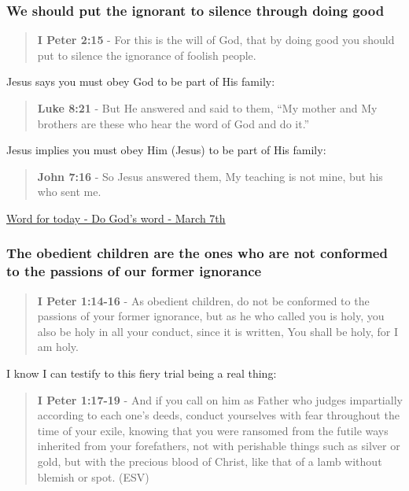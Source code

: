 \documentclass[11pt]{article}
\begin{document}
\subsubsection{We should put the ignorant to silence through doing good}
\label{sec:org1d5a648}

\begin{quote}
\textbf{I Peter 2:15} - For this is the will of God, that by doing good you should put to silence the ignorance of foolish people.
\end{quote}

Jesus says you must obey God to be part of His family:

\begin{quote}
\textbf{Luke 8:21} - But He answered and said to them, “My mother and My brothers are these who hear the word of God and do it.”
\end{quote}

Jesus implies you must obey Him (Jesus) to be part of His family:

\begin{quote}
\textbf{John 7:16} - So Jesus answered them, My teaching is not mine, but his who sent me.
\end{quote}

\href{https://www.star.net.nz/the-word-for-today/do-gods-word-2024\_03\_07}{Word for today - Do God's word - March 7th}

\subsubsection{The obedient children are the ones who are not conformed to the passions of our former ignorance}
\label{sec:orgb40410b}
\begin{quote}
\textbf{I Peter 1:14-16} - As obedient children, do not be conformed to the passions of your former ignorance, but as he who called you is holy, you also be holy in all your conduct, since it is written, You shall be holy, for I am holy.
\end{quote}

I know I can testify to this fiery trial being a real thing:

\begin{quote}
\textbf{I Peter 1:17-19} - And if you call on him as Father who judges impartially according to each one's deeds, conduct yourselves with fear throughout the time of your exile, knowing that you were ransomed from the futile ways inherited from your forefathers, not with perishable things such as silver or gold, but with the precious blood of Christ, like that of a lamb without blemish or spot. (ESV)
\end{quote}
\end{document}
